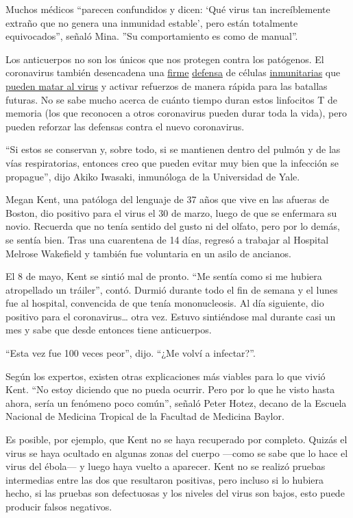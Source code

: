Muchos médicos ``parecen confundidos y dicen: `Qué virus tan
increíblemente extraño que no genera una inmunidad estable', pero están
totalmente equivocados'', señaló Mina. ''Su comportamiento es como de
manual''.

Los anticuerpos no son los únicos que nos protegen contra los patógenos.
El coronavirus también desencadena una
\href{https://www.biorxiv.org/content/10.1101/2020.06.29.174888v1}{firme}
\href{https://www.medrxiv.org/content/10.1101/2020.04.11.20062349v2?\%253fcollection=}{defensa}
de células
\href{https://www.medrxiv.org/content/10.1101/2020.05.13.20100636v1?\%253fcollection=}{inmunitarias}
que \href{https://pubmed.ncbi.nlm.nih.gov/32473127/}{pueden matar al
virus} y activar refuerzos de manera rápida para las batallas futuras.
No se sabe mucho acerca de cuánto tiempo duran estos linfocitos T de
memoria (los que reconocen a otros coronavirus pueden durar toda la
vida), pero pueden reforzar las defensas contra el nuevo coronavirus.

``Si estos se conservan y, sobre todo, si se mantienen dentro del pulmón
y de las vías respiratorias, entonces creo que pueden evitar muy bien
que la infección se propague'', dijo Akiko Iwasaki, inmunóloga de la
Universidad de Yale.

Megan Kent, una patóloga del lenguaje de 37 años que vive en las afueras
de Boston, dio positivo para el virus el 30 de marzo, luego de que se
enfermara su novio. Recuerda que no tenía sentido del gusto ni del
olfato, pero por lo demás, se sentía bien. Tras una cuarentena de 14
días, regresó a trabajar al Hospital Melrose Wakefield y también fue
voluntaria en un asilo de ancianos.

El 8 de mayo, Kent se sintió mal de pronto. ``Me sentía como si me
hubiera atropellado un tráiler'', contó. Durmió durante todo el fin de
semana y el lunes fue al hospital, convencida de que tenía
mononucleosis. Al día siguiente, dio positivo para el
coronavirus\ldots{} otra vez. Estuvo sintiéndose mal durante casi un mes
y sabe que desde entonces tiene anticuerpos.

``Esta vez fue 100 veces peor'', dijo. ``¿Me volví a infectar?''.

Según los expertos, existen otras explicaciones más viables para lo que
vivió Kent. ``No estoy diciendo que no pueda ocurrir. Pero por lo que he
visto hasta ahora, sería un fenómeno poco común'', señaló Peter Hotez,
decano de la Escuela Nacional de Medicina Tropical de la Facultad de
Medicina Baylor.

Es posible, por ejemplo, que Kent no se haya recuperado por completo.
Quizás el virus se haya ocultado en algunas zonas del cuerpo ---como se
sabe que lo hace el virus del ébola--- y luego haya vuelto a aparecer.
Kent no se realizó pruebas intermedias entre las dos que resultaron
positivas, pero incluso si lo hubiera hecho, si las pruebas son
defectuosas y los niveles del virus son bajos, esto puede producir
falsos negativos.

